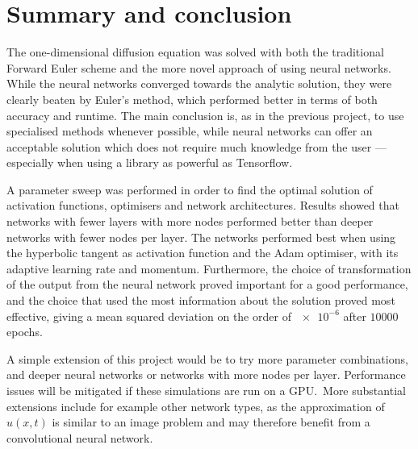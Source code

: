 \documentclass[11pt,british,a4paper]{article}
\numberwithin{equation}{section}
\begin{document}
\section{Summary and conclusion}
The one-dimensional diffusion equation was solved with both the traditional Forward Euler scheme and the more novel approach of using neural networks. While the neural networks converged towards the analytic solution, they were clearly beaten by Euler's method, which performed better in terms of both accuracy and runtime. The main conclusion is, as in the previous project, to use specialised methods whenever possible, while neural networks can offer an acceptable solution which does not require much knowledge from the user --- especially when using a library as powerful as Tensorflow.

A parameter sweep was performed in order to find the optimal solution of activation functions, optimisers and network architectures. Results showed that networks with fewer layers with more nodes performed better than deeper networks with fewer nodes per layer. The networks performed best when using the hyperbolic tangent as activation function and the Adam optimiser, with its adaptive learning rate and momentum. Furthermore, the choice of transformation of the output from the neural network proved important for a good performance, and the choice that used the most information about the solution proved most effective, giving a mean squared deviation on the order of \(\num{e-6}\) after \(\num{10000}\) epochs.

A simple extension of this project would be to try more parameter combinations, and deeper neural networks or networks with more nodes per layer. Performance issues will be mitigated if these simulations are run on a GPU.\ More substantial extensions include for example other network types, as the approximation of \(u(x,t)\) is similar to an image problem and may therefore benefit from a convolutional neural network.



\nocite{*}
\printbibliography{}
\end{document}
